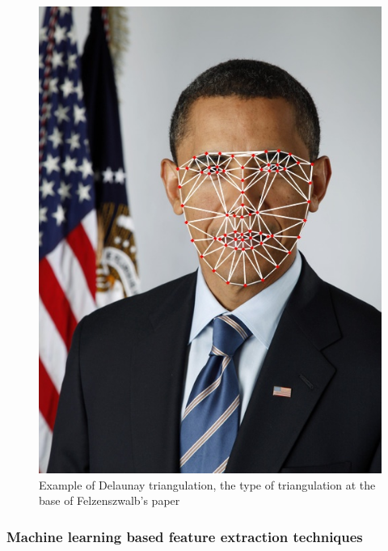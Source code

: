 \documentclass[conference]{IEEEtran}
\begin{document}
					\begin{figure}[!ht]
						\centerline{\includegraphics[height=0.4\textheight]{imgs/delaunay.jpg}}
						\caption{Example of Delaunay triangulation, the type of triangulation at the base of Felzenszwalb's paper}
						\label{fig:3}
					\end{figure}
					
				\subsubsection{Machine learning based feature extraction techniques} \label{mlfe}
					
\end{document}
